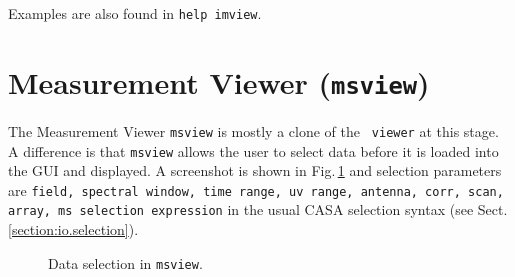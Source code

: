 Examples are also found in {\tt help imview}.

\section{Measurement Viewer ({\tt msview})}
\label{section:display.msview}

The Measurement Viewer {\tt msview} is mostly a clone of the {\tt
  viewer} at this stage. A difference is that {\tt msview} allows the
user to select data before it is loaded into the GUI and displayed. A
screenshot is shown in Fig.\,\ref{fig:msview-selection} and selection
parameters are {\tt field, spectral window, time range, uv range,
  antenna, corr, scan, array, ms selection expression} in the usual
CASA selection syntax (see Sect.\,\ref{section:io.selection}). 


\begin{figure}[h!]
\begin{center}
\caption{\label{fig:msview-selection} Data selection in {\tt msview}.}
\hrulefill
\end{center}
\end{figure}
 
